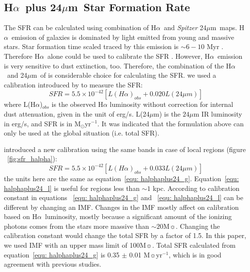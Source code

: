 \documentclass[useAMS,usenatbib]{mn2e}
\newcommand \halpha    {H$\alpha $\ }
\newcommand \um    {$\mu$m\ }
\newcommand \Spitzer {{\it Spitzer }}
\begin{document}
\subsection{\halpha plus 24\um Star Formation Rate}
\label{sec:sfr_halpha}

The SFR can be calculated using combination of \halpha and \Spitzer  24\um maps. \halpha emission of galaxies is dominated by light emitted from young and massive stars. Star formation time scaled traced by this emission is $\sim 6-10$ Myr \citep[e.g.,][]{Kennicutt09, Calzetti13}. Therefore \halpha alone could be used to calibrate the SFR \citep[e.g.,][]{Osterbrock06, Kennicutt09}. However, \halpha emission is very sensitive to dust extinction, too. Therefore, the combination of the \halpha and 24\um of is considerable choice for calculating the SFR. we used a calibration introduced by \cite{Kennicutt09} to measure the SFR:
\begin{equation}
\label{equ: halphaplus24_g}
SFR = 5.5 \times 10^{-42}[L(H{\alpha})_{obs} + 0.020L(24\mu m)]
\end{equation}
where L(H${\alpha}$)$_{obs}$ is the observed H${\alpha}$ luminosity without correction for internal dust attenuation, given in the unit of erg/s. L(24$\mu$m) is the $24\mu$m IR luminosity in erg/s, and SFR is in M$_{\odot}$yr$^{-1}$. It was indicated that the formulation above can only be used at the global situation (i.e. total SFR).

\cite{Calzetti07} introduced a new calibration using the same bands in case of local regions (figure ~\ref{fig:sfr_halpha}):
\begin{equation}
\label{equ: halphaplus24_l}
SFR = 5.5 \times 10^{-42}[L(H{\alpha})_{obs} + 0.033L(24\mu m)]
\end{equation}
the units here are the same as equation~\ref{equ: halphaplus24_g}. Equation~\ref{equ: halphaplus24_l} is useful for regions less than $\sim 1$ kpc. According to  \cite{Calzetti07} calibration constant in equations ~\ref{equ: halphaplus24_g} and ~\ref{equ: halphaplus24_l} can be different by changing an IMF. Changes in the IMF mostly affect on calibration based on \halpha luminosity, mostly because a significant amount of the ionizing photons comes from the stars more massive than $\sim 20$M$\sun$. Changing the calibration constant would change the total SFR by a factor of 1.5. In this paper, we used \cite{Kroupa01} IMF with an upper mass limit of 100M$\sun$. Total SFR calculated from equation~\ref{equ: halphaplus24_g} is 0.35 $\pm$ 0.01 M$\sun$yr$^{-1}$, which is in good agreement with previous studies.
\end{document}
